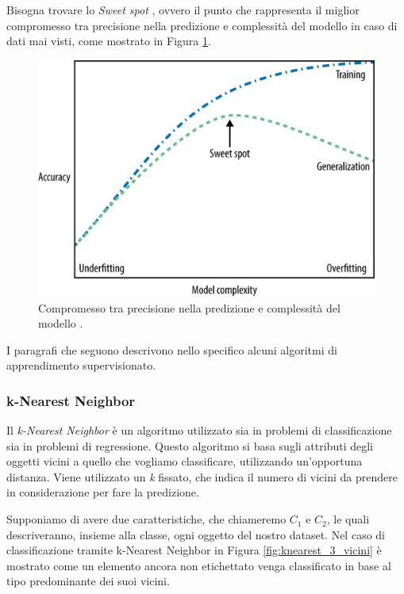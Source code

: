 \documentclass[a4paper,12pt]{report}
\begin{document}

Bisogna trovare lo \textit{Sweet spot} \cite{machine_learning_oreilly}, ovvero il punto che rappresenta il miglior compromesso tra precisione nella predizione e complessità del modello in caso di dati mai visti, come mostrato in Figura \ref{fig:sweet_spot}.
\begin{figure}[ht]
    \centering
    \includegraphics[scale = 0.35]{images/sweet_spot.png}
    \caption{Compromesso tra precisione nella predizione e complessità del modello \cite{figure_copyright}.}
    \label{fig:sweet_spot}

\end{figure}


\bigskip
I paragrafi che seguono descrivono nello specifico alcuni algoritmi di apprendimento supervisionato.

\subsubsection{k-Nearest Neighbor}

Il \textit{k-Nearest Neighbor} è un algoritmo utilizzato sia in problemi di classificazione sia in problemi di regressione. 
Questo algoritmo si basa sugli attributi degli oggetti vicini a quello che vogliamo classificare, utilizzando un'opportuna distanza. Viene utilizzato un \textit{k} fissato, che indica il numero di vicini da prendere in considerazione per fare la predizione.

Supponiamo di avere due  caratteristiche, che chiameremo $C_{1}$ e $C_{2}$, le quali descriveranno, insieme alla classe, ogni oggetto del nostro dataset. Nel caso di classificazione tramite k-Nearest Neighbor in Figura \ref{fig:knearest_3_vicini} è mostrato come un elemento ancora non etichettato venga classificato in base al tipo predominante dei suoi vicini.
\end{document}
